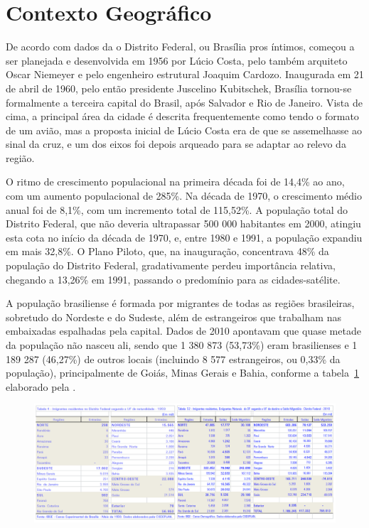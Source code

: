 \section{Contexto Geográfico}

De acordo com dados da  o Distrito Federal, ou Brasília pros íntimos, começou a ser planejada e desenvolvida em 1956 por Lúcio Costa, pelo também arquiteto Oscar Niemeyer e pelo engenheiro estrutural Joaquim Cardozo. Inaugurada em 21 de abril de 1960, pelo então presidente Juscelino Kubitschek, Brasília tornou-se formalmente a terceira capital do Brasil, após Salvador e Rio de Janeiro. Vista de cima, a principal área da cidade é descrita frequentemente como tendo o formato de um avião, mas a proposta inicial de Lúcio Costa era de que se assemelhasse ao sinal da cruz, e um dos eixos foi depois arqueado para se adaptar ao relevo da região.

O ritmo de crescimento populacional na primeira década foi de 14,4\% ao ano, com um aumento populacional de 285\%. Na década de 1970, o crescimento médio anual foi de 8,1\%, com um incremento total de 115,52\%. A população total do Distrito Federal, que não deveria ultrapassar 500 000 habitantes em 2000, atingiu esta cota no início da década de 1970, e, entre 1980 e 1991, a população expandiu em mais 32,8\%. O Plano Piloto, que, na inauguração, concentrava 48\% da população do Distrito Federal, gradativamente perdeu importância relativa, chegando a 13,26\% em 1991, passando o predomínio para as cidades-satélite.


A população brasiliense é formada por migrantes de todas as regiões brasileiras, sobretudo do Nordeste e do Sudeste, além de estrangeiros que trabalham nas embaixadas espalhadas pela capital. Dados de 2010 apontavam que quase metade da população não nasceu ali, sendo que 1 380 873 (53,73\%) eram brasilienses e 1 189 287 (46,27\%) de outros locais (incluindo 8 577 estrangeiros, ou 0,33\% da população), principalmente de Goiás, Minas Gerais e Bahia, conforme a tabela~\ref*{table:migrantes-1959-2010} elaborado pela .

\begin{figure}[h!]
    \centering
    \includegraphics[width=0.95\linewidth]{fig/migrantes-1959-2010}
    \caption[Quadro comparativo de migrantes em brasília]{}
    \label{table:migrantes-1959-2010}
\end{figure}


